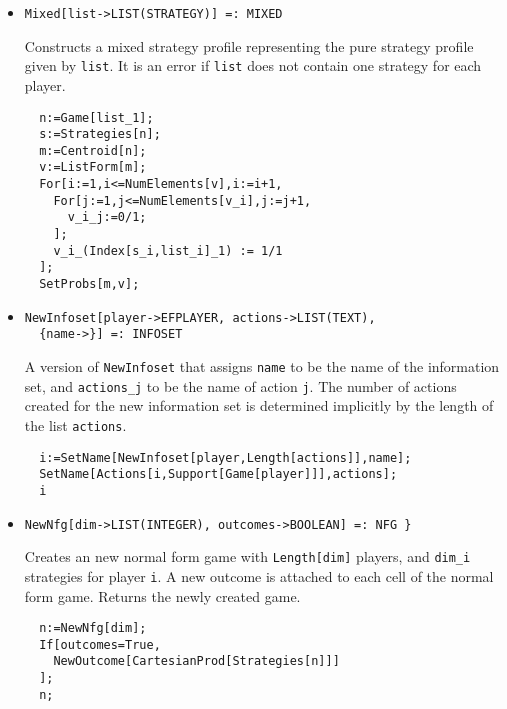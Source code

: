\begin{itemize}
\item{}
\protect \large \begin{verbatim}
Mixed[list->LIST(STRATEGY)] =: MIXED 
\end{verbatim}\normalsize

\bd 
Constructs a mixed strategy profile representing the pure strategy
profile given by \verb+list+. It is an error if \verb+list+ does not
contain one strategy for each player.
\begin{verbatim}
  n:=Game[list_1];
  s:=Strategies[n];
  m:=Centroid[n];
  v:=ListForm[m];
  For[i:=1,i<=NumElements[v],i:=i+1,
    For[j:=1,j<=NumElements[v_i],j:=j+1,
      v_i_j:=0/1;
    ];
    v_i_(Index[s_i,list_i]_1) := 1/1
  ];
  SetProbs[m,v];   
\end{verbatim} 
\ed



\item{}
\protect \large \begin{verbatim}
NewInfoset[player->EFPLAYER, actions->LIST(TEXT), 
  {name->}] =: INFOSET 
\end{verbatim}\normalsize

\bd 
A version of \verb+NewInfoset+ that assigns \verb+name+ to be the name
of the information set, and \verb+actions_j+ to be the name of action
\verb+j+.  The number of actions created for the new information set
is determined implicitly by the length of the list \verb+actions+.  
\begin{verbatim}
  i:=SetName[NewInfoset[player,Length[actions]],name];
  SetName[Actions[i,Support[Game[player]]],actions];
  i
\end{verbatim} 
\ed

\item{}
\protect \large \begin{verbatim}
NewNfg[dim->LIST(INTEGER), outcomes->BOOLEAN] =: NFG }
\end{verbatim}\normalsize

\bd 

Creates an new normal form game with \verb+Length[dim]+ players, and
\verb+dim_i+ strategies for player \verb+i+.  A new outcome is
attached to each cell of the normal form game.  Returns the newly
created game.

\begin{verbatim}
  n:=NewNfg[dim];
  If[outcomes=True,
    NewOutcome[CartesianProd[Strategies[n]]]
  ];
  n;
\end{verbatim} 
\ed


\end{itemize}
